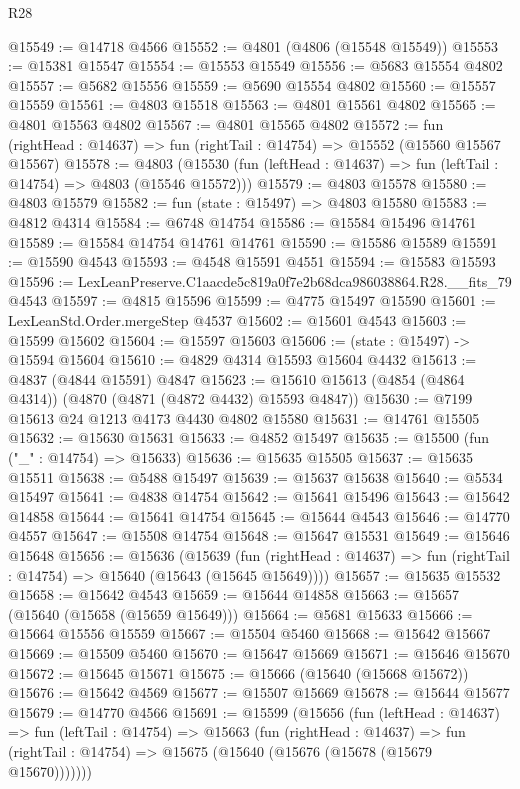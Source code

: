 \begin{lexlean}{R28}
\begin{coremodule}
@15549 := @14718 @4566
@15552 := @4801 (@4806 (@15548 @15549))
@15553 := @15381 @15547
@15554 := @15553 @15549
@15556 := @5683 @15554 @4802
@15557 := @5682 @15556
@15559 := @5690 @15554 @4802
@15560 := @15557 @15559
@15561 := @4803 @15518
@15563 := @4801 @15561 @4802
@15565 := @4801 @15563 @4802
@15567 := @4801 @15565 @4802
@15572 := fun (rightHead : @14637) => fun (rightTail : @14754) => @15552 (@15560 @15567 @15567)
@15578 := @4803
    (@15530 (fun (leftHead : @14637) => fun (leftTail : @14754) => @4803 (@15546 @15572)))
@15579 := @4803 @15578
@15580 := @4803 @15579
@15582 := fun (state : @15497) => @4803 @15580
@15583 := @4812 @4314
@15584 := @6748 @14754
@15586 := @15584 @15496 @14761
@15589 := @15584 @14754 @14761 @14761
@15590 := @15586 @15589
@15591 := @15590 @4543
@15593 := @4548 @15591 @4551
@15594 := @15583 @15593
@15596 := LexLeanPreserve.C1aacde5c819a0f7e2b68dca986038864.R28.__fits_79 @4543
@15597 := @4815 @15596
@15599 := @4775 @15497 @15590
@15601 := LexLeanStd.Order.mergeStep @4537
@15602 := @15601 @4543
@15603 := @15599 @15602
@15604 := @15597 @15603
@15606 := (state : @15497) -> @15594 @15604
@15610 := @4829 @4314 @15593 @15604 @4432
@15613 := @4837 (@4844 @15591) @4847
@15623 := @15610 @15613 (@4854 (@4864 @4314)) (@4870 (@4871 (@4872 @4432) @15593 @4847))
@15630 := @7199 @15613 @24 @1213 @4173 @4430 @4802 @15580
@15631 := @14761 @15505
@15632 := @15630 @15631
@15633 := @4852 @15497
@15635 := @15500 (fun ("_" : @14754) => @15633)
@15636 := @15635 @15505
@15637 := @15635 @15511
@15638 := @5488 @15497
@15639 := @15637 @15638
@15640 := @5534 @15497
@15641 := @4838 @14754
@15642 := @15641 @15496
@15643 := @15642 @14858
@15644 := @15641 @14754
@15645 := @15644 @4543
@15646 := @14770 @4557
@15647 := @15508 @14754
@15648 := @15647 @15531
@15649 := @15646 @15648
@15656 := @15636
    (@15639
      (fun (rightHead : @14637) => fun (rightTail : @14754) => @15640 (@15643 (@15645 @15649))))
@15657 := @15635 @15532
@15658 := @15642 @4543
@15659 := @15644 @14858
@15663 := @15657 (@15640 (@15658 (@15659 @15649)))
@15664 := @5681 @15633
@15666 := @15664 @15556 @15559
@15667 := @15504 @5460
@15668 := @15642 @15667
@15669 := @15509 @5460
@15670 := @15647 @15669
@15671 := @15646 @15670
@15672 := @15645 @15671
@15675 := @15666 (@15640 (@15668 @15672))
@15676 := @15642 @4569
@15677 := @15507 @15669
@15678 := @15644 @15677
@15679 := @14770 @4566
@15691 := @15599
    (@15656
      (fun (leftHead : @14637) =>
      fun (leftTail : @14754) =>
      @15663
        (fun (rightHead : @14637) =>
        fun (rightTail : @14754) => @15675 (@15640 (@15676 (@15678 (@15679 @15670)))))))

\end{coremodule}
\end{lexlean}
